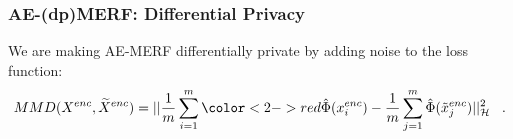 \begin{frame}
    \frametitle{AE-(dp)MERF: Differential Privacy}
    We are making AE-MERF differentially private by adding noise to the loss function:
    \begin{align}
        MMD(X^{enc},\widetilde{X}^{enc}) =|| \frac{1}{m} \sum_{i=1}^m {\color<2->{red}\hat{\Phi}(x_i^{enc})} - \frac{1}{m} \sum_{j=1}^m \hat{\Phi}(\tilde{x}_j^{enc}) ||_\mathcal{H}^2 \mperiod
    \end{align}
    

\end{frame}


